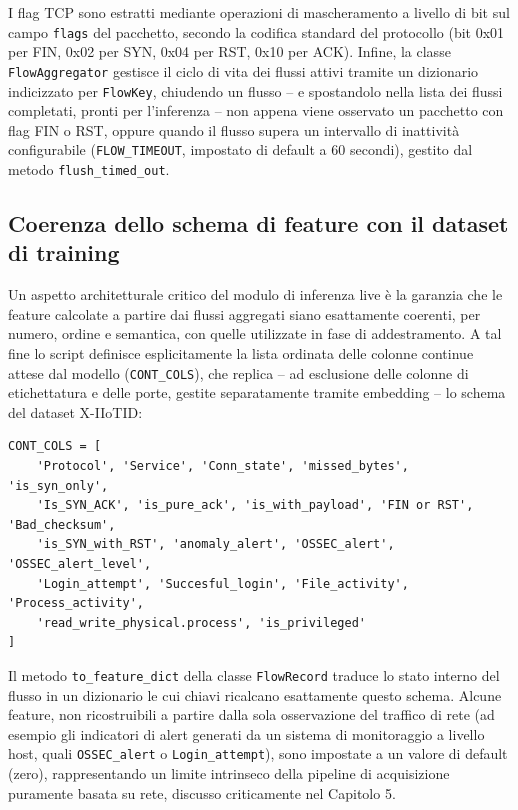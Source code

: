 \documentclass[12pt,a4paper]{report}
\begin{document}
I flag TCP sono estratti mediante operazioni di mascheramento a livello di bit sul campo \texttt{flags} del pacchetto, secondo la codifica standard del protocollo (bit 0x01 per FIN, 0x02 per SYN, 0x04 per RST, 0x10 per ACK). Infine, la classe \texttt{FlowAggregator} gestisce il ciclo di vita dei flussi attivi tramite un dizionario indicizzato per \texttt{FlowKey}, chiudendo un flusso -- e spostandolo nella lista dei flussi completati, pronti per l'inferenza -- non appena viene osservato un pacchetto con flag FIN o RST, oppure quando il flusso supera un intervallo di inattività configurabile (\texttt{FLOW\_TIMEOUT}, impostato di default a 60 secondi), gestito dal metodo \texttt{flush\_timed\_out}.

\subsection{Coerenza dello schema di feature con il dataset di training}

Un aspetto architetturale critico del modulo di inferenza live è la garanzia che le feature calcolate a partire dai flussi aggregati siano esattamente coerenti, per numero, ordine e semantica, con quelle utilizzate in fase di addestramento. A tal fine lo script definisce esplicitamente la lista ordinata delle colonne continue attese dal modello (\texttt{CONT\_COLS}), che replica -- ad esclusione delle colonne di etichettatura e delle porte, gestite separatamente tramite embedding -- lo schema del dataset X-IIoTID:

\begin{lstlisting}[caption={Mappatura esplicita delle colonne del dataset reale (\texttt{ACDBliveScript.py})}]
CONT_COLS = [
    'Protocol', 'Service', 'Conn_state', 'missed_bytes', 'is_syn_only',
    'Is_SYN_ACK', 'is_pure_ack', 'is_with_payload', 'FIN or RST', 'Bad_checksum',
    'is_SYN_with_RST', 'anomaly_alert', 'OSSEC_alert', 'OSSEC_alert_level',
    'Login_attempt', 'Succesful_login', 'File_activity', 'Process_activity',
    'read_write_physical.process', 'is_privileged'
]
\end{lstlisting}

Il metodo \texttt{to\_feature\_dict} della classe \texttt{FlowRecord} traduce lo stato interno del flusso in un dizionario le cui chiavi ricalcano esattamente questo schema. Alcune feature, non ricostruibili a partire dalla sola osservazione del traffico di rete (ad esempio gli indicatori di alert generati da un sistema di monitoraggio a livello host, quali \texttt{OSSEC\_alert} o \texttt{Login\_attempt}), sono impostate a un valore di default (zero), rappresentando un limite intrinseco della pipeline di acquisizione puramente basata su rete, discusso criticamente nel Capitolo 5.
\end{document}
